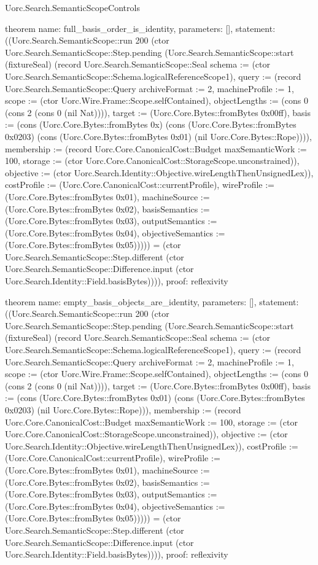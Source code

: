 \begin{lexlean}{Uorc.Search.SemanticScopeControls}
\begin{semanticmodule}
theorem{
  name: full_basis_order_is_identity,
  parameters: [],
  statement: ((Uorc.Search.SemanticScope::run 200 (ctor Uorc.Search.SemanticScope::Step.pending (Uorc.Search.SemanticScope::start (fixtureSeal) (record Uorc.Search.SemanticScope::Seal {schema := (ctor Uorc.Search.SemanticScope::Schema.logicalReferenceScope1), query := (record Uorc.Search.SemanticScope::Query {archiveFormat := 2, machineProfile := 1, scope := (ctor Uorc.Wire.Frame::Scope.selfContained), objectLengths := (cons 0 (cons 2 (cons 0 (nil Nat)))), target := (Uorc.Core.Bytes::fromBytes 0x00ff), basis := (cons (Uorc.Core.Bytes::fromBytes 0x) (cons (Uorc.Core.Bytes::fromBytes 0x0203) (cons (Uorc.Core.Bytes::fromBytes 0x01) (nil Uorc.Core.Bytes::Rope)))), membership := (record Uorc.Core.CanonicalCost::Budget {maxSemanticWork := 100, storage := (ctor Uorc.Core.CanonicalCost::StorageScope.unconstrained)}), objective := (ctor Uorc.Search.Identity::Objective.wireLengthThenUnsignedLex)}), costProfile := (Uorc.Core.CanonicalCost::currentProfile), wireProfile := (Uorc.Core.Bytes::fromBytes 0x01), machineSource := (Uorc.Core.Bytes::fromBytes 0x02), basisSemantics := (Uorc.Core.Bytes::fromBytes 0x03), outputSemantics := (Uorc.Core.Bytes::fromBytes 0x04), objectiveSemantics := (Uorc.Core.Bytes::fromBytes 0x05)})))) = (ctor Uorc.Search.SemanticScope::Step.different (ctor Uorc.Search.SemanticScope::Difference.input (ctor Uorc.Search.Identity::Field.basisBytes)))),
  proof: reflexivity{}
}

theorem{
  name: empty_basis_objects_are_identity,
  parameters: [],
  statement: ((Uorc.Search.SemanticScope::run 200 (ctor Uorc.Search.SemanticScope::Step.pending (Uorc.Search.SemanticScope::start (fixtureSeal) (record Uorc.Search.SemanticScope::Seal {schema := (ctor Uorc.Search.SemanticScope::Schema.logicalReferenceScope1), query := (record Uorc.Search.SemanticScope::Query {archiveFormat := 2, machineProfile := 1, scope := (ctor Uorc.Wire.Frame::Scope.selfContained), objectLengths := (cons 0 (cons 2 (cons 0 (nil Nat)))), target := (Uorc.Core.Bytes::fromBytes 0x00ff), basis := (cons (Uorc.Core.Bytes::fromBytes 0x01) (cons (Uorc.Core.Bytes::fromBytes 0x0203) (nil Uorc.Core.Bytes::Rope))), membership := (record Uorc.Core.CanonicalCost::Budget {maxSemanticWork := 100, storage := (ctor Uorc.Core.CanonicalCost::StorageScope.unconstrained)}), objective := (ctor Uorc.Search.Identity::Objective.wireLengthThenUnsignedLex)}), costProfile := (Uorc.Core.CanonicalCost::currentProfile), wireProfile := (Uorc.Core.Bytes::fromBytes 0x01), machineSource := (Uorc.Core.Bytes::fromBytes 0x02), basisSemantics := (Uorc.Core.Bytes::fromBytes 0x03), outputSemantics := (Uorc.Core.Bytes::fromBytes 0x04), objectiveSemantics := (Uorc.Core.Bytes::fromBytes 0x05)})))) = (ctor Uorc.Search.SemanticScope::Step.different (ctor Uorc.Search.SemanticScope::Difference.input (ctor Uorc.Search.Identity::Field.basisBytes)))),
  proof: reflexivity{}
}


\end{semanticmodule}
\end{lexlean}
